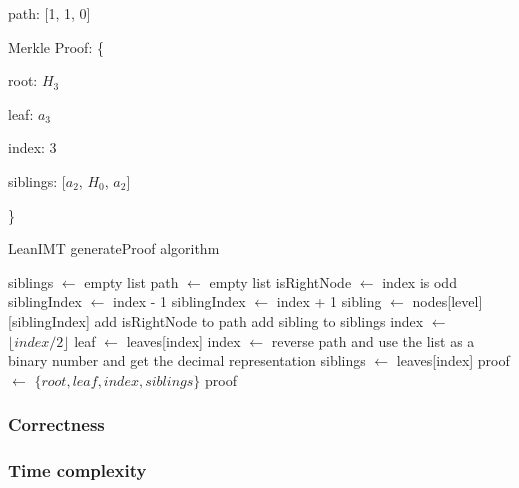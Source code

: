 \documentclass{article}
\begin{document}
\bigbreak

path: [1, 1, 0]

Merkle Proof: \{

root: $H_3$

leaf: $a_3$

index: 3

siblings: [$a_2$, $H_0$, $a_2$]

\}

\bigbreak

\begin{algorithm}[H]
    \caption{LeanIMT generateProof algorithm}\label{generateProof}
    \begin{algorithmic}[1]
        \State siblings $\gets$ empty list 
        \State path $\gets$ empty list 
        \State isRightNode $\gets$ index is odd
         
        \State siblingIndex $\gets$ index - 1
        \Else {}
        \State siblingIndex $\gets$ index + 1
        \EndIf
        \State sibling $\gets$ nodes[level][siblingIndex]
        \State add isRightNode to path
        \State add sibling to siblings
        \EndIf
        \State index $\gets$ $\lfloor index/2 \rfloor$ 
        \EndFor
        \State leaf $\gets$ leaves[index]
        \State index $\gets$ reverse path and use the list as a binary number and get the decimal representation
        \State siblings $\gets$ leaves[index]
        \State proof $\gets$ $\{root, leaf , index, siblings \}$
        \State \Return proof
        \EndProcedure
    \end{algorithmic}
\end{algorithm}

\bigbreak

\subsubsection{Correctness}

\bigbreak

\subsubsection{Time complexity}
\end{document}
